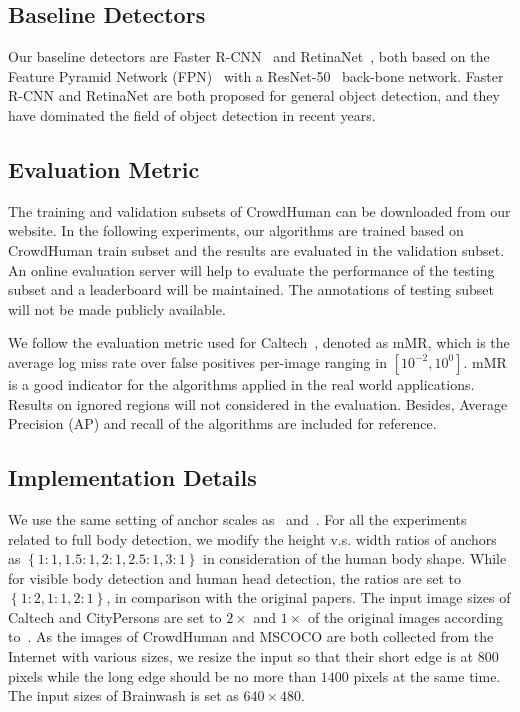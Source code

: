 \documentclass[10pt,twocolumn,letterpaper]{article}
\begin{document}
\subsection{Baseline Detectors}
Our baseline detectors are Faster R-CNN~\cite{ren2015faster} and RetinaNet~\cite{lin2017focal}, both based on the Feature Pyramid Network (FPN)~\cite{lin2017feature} with a ResNet-50~\cite{he2016deep} back-bone network. Faster R-CNN and RetinaNet are both proposed for general object detection, and they have dominated the field of object detection in recent years. 




\subsection{Evaluation Metric}
The training and validation subsets of CrowdHuman can be downloaded from our website. In the following experiments, our algorithms are trained based on CrowdHuman train subset and the results are evaluated in the validation subset.  An online evaluation server will help to evaluate the performance of the testing subset and a leaderboard will be maintained. The annotations of testing subset will not be made publicly available.

We follow the evaluation metric used for Caltech~\cite{dollar2009pedestrian}, denoted as mMR, which is the average log miss rate over false positives per-image ranging in $\left[ 10^{-2}, 10^0\right]$. mMR is a good indicator for the algorithms applied in the real world applications. Results on ignored regions will not considered in the evaluation. Besides, Average Precision (AP) and recall of the algorithms are included for reference.


\subsection{Implementation Details}
We use the same setting of anchor scales as~\cite{lin2017feature} and~\cite{lin2017focal}. For all the experiments related to full body detection, we modify the height v.s. width ratios of anchors as $\left\{ 1:1, 1.5:1, 2:1, 2.5:1, 3:1 \right\}$ in consideration of  the human body shape. While for visible body detection and human head detection, the ratios are set to $\left\{ 1:2, 1:1, 2:1 \right\}$, in comparison with the original papers. The input image sizes of Caltech and CityPersons are set to $2\times$ and $1\times$ of the original images according to~\cite{zhang2017citypersons}. As the images of CrowdHuman and MSCOCO are both collected from the Internet with various sizes, we resize the input so that their short edge is at $800$ pixels while the long edge should be no more than $1400$ pixels at the same time. The input sizes of Brainwash is set as $640\times480$.
\end{document}
